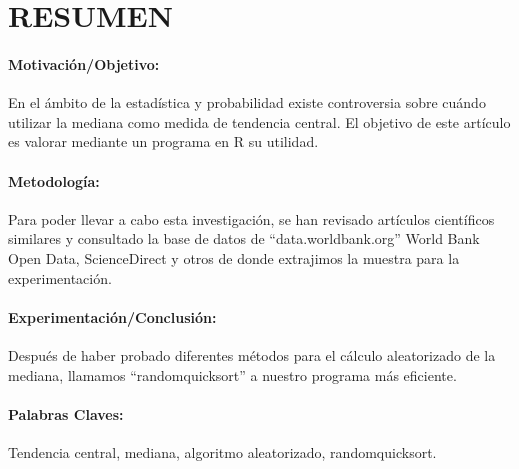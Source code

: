 \documentclass[a4 paper,12pt]{article}
\begin{document}
	\section*{RESUMEN}
	\paragraph{Motivación/Objetivo:}
	En el ámbito de la estadística y probabilidad existe controversia sobre cuándo utilizar la mediana como medida de tendencia central. El objetivo de este artículo es valorar mediante un programa en R su utilidad.
	\paragraph{Metodología:}
	Para poder llevar a cabo esta investigación, se han revisado artículos científicos similares y consultado la base de datos de “data.worldbank.org” World Bank Open Data, ScienceDirect y otros de donde extrajimos la muestra para la experimentación.
	\paragraph{Experimentación/Conclusión:}
	Después de haber probado diferentes métodos para el cálculo aleatorizado de la mediana, llamamos “randomquicksort” a nuestro programa más eficiente.
	\paragraph{Palabras Claves:}
	Tendencia central, mediana, algoritmo aleatorizado, randomquicksort.
\end{document}

